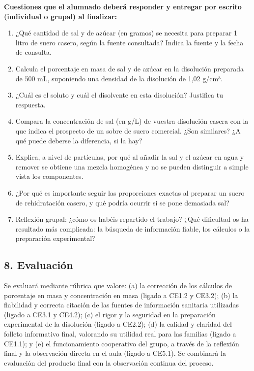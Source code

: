 \documentclass[11pt,a4paper]{article}
\begin{document}
\textbf{Cuestiones que el alumnado deberá responder y entregar por escrito (individual o grupal) al finalizar:}
\begin{enumerate}
    \item ¿Qué cantidad de sal y de azúcar (en gramos) se necesita para preparar 1 litro de suero casero, según la fuente consultada? Indica la fuente y la fecha de consulta.
    \item Calcula el porcentaje en masa de sal y de azúcar en la disolución preparada de 500 mL, suponiendo una densidad de la disolución de 1,02 g/cm³.
    \item ¿Cuál es el soluto y cuál el disolvente en esta disolución? Justifica tu respuesta.
    \item Compara la concentración de sal (en g/L) de vuestra disolución casera con la que indica el prospecto de un sobre de suero comercial. ¿Son similares? ¿A qué puede deberse la diferencia, si la hay?
    \item Explica, a nivel de partículas, por qué al añadir la sal y el azúcar en agua y remover se obtiene una mezcla homogénea y no se pueden distinguir a simple vista los componentes.
    \item ¿Por qué es importante seguir las proporciones exactas al preparar un suero de rehidratación casero, y qué podría ocurrir si se pone demasiada sal?
    \item Reflexión grupal: ¿cómo os habéis repartido el trabajo? ¿Qué dificultad os ha resultado más complicada: la búsqueda de información fiable, los cálculos o la preparación experimental?
\end{enumerate}

\subsection*{8. Evaluación}
Se evaluará mediante rúbrica que valore: (a) la corrección de los cálculos de porcentaje en masa y concentración en masa (ligado a CE1.2 y CE3.2); (b) la fiabilidad y correcta citación de las fuentes de información sanitaria utilizadas (ligado a CE3.1 y CE4.2); (c) el rigor y la seguridad en la preparación experimental de la disolución (ligado a CE2.2); (d) la calidad y claridad del folleto informativo final, valorando su utilidad real para las familias (ligado a CE1.1); y (e) el funcionamiento cooperativo del grupo, a través de la reflexión final y la observación directa en el aula (ligado a CE5.1). Se combinará la evaluación del producto final con la observación continua del proceso.
\end{document}
